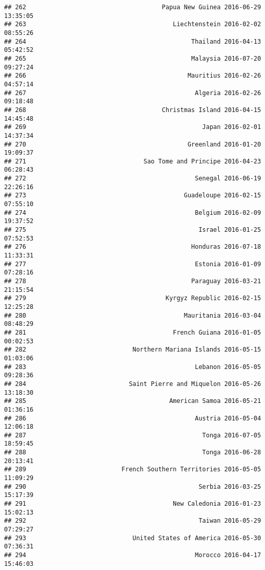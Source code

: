 \documentclass[
]{article}
\begin{document}
\begin{verbatim}
## 262                                     Papua New Guinea 2016-06-29 13:35:05
## 263                                        Liechtenstein 2016-02-02 08:55:26
## 264                                             Thailand 2016-04-13 05:42:52
## 265                                             Malaysia 2016-07-20 09:27:24
## 266                                            Mauritius 2016-02-26 04:57:14
## 267                                              Algeria 2016-02-26 09:18:48
## 268                                     Christmas Island 2016-04-15 14:45:48
## 269                                                Japan 2016-02-01 14:37:34
## 270                                            Greenland 2016-01-20 19:09:37
## 271                                Sao Tome and Principe 2016-04-23 06:28:43
## 272                                              Senegal 2016-06-19 22:26:16
## 273                                           Guadeloupe 2016-02-15 07:55:10
## 274                                              Belgium 2016-02-09 19:37:52
## 275                                               Israel 2016-01-25 07:52:53
## 276                                             Honduras 2016-07-18 11:33:31
## 277                                              Estonia 2016-01-09 07:28:16
## 278                                             Paraguay 2016-03-21 21:15:54
## 279                                      Kyrgyz Republic 2016-02-15 12:25:28
## 280                                           Mauritania 2016-03-04 08:48:29
## 281                                        French Guiana 2016-01-05 00:02:53
## 282                             Northern Mariana Islands 2016-05-15 01:03:06
## 283                                              Lebanon 2016-05-05 09:28:36
## 284                            Saint Pierre and Miquelon 2016-05-26 13:18:30
## 285                                       American Samoa 2016-05-21 01:36:16
## 286                                              Austria 2016-05-04 12:06:18
## 287                                                Tonga 2016-07-05 18:59:45
## 288                                                Tonga 2016-06-28 20:13:41
## 289                          French Southern Territories 2016-05-05 11:09:29
## 290                                               Serbia 2016-03-25 15:17:39
## 291                                        New Caledonia 2016-01-23 15:02:13
## 292                                               Taiwan 2016-05-29 07:29:27
## 293                             United States of America 2016-05-30 07:36:31
## 294                                              Morocco 2016-04-17 15:46:03

\end{verbatim}
\end{document}
